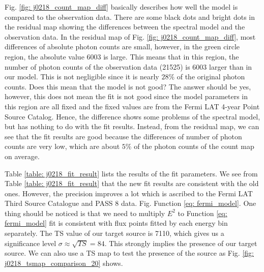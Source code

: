 \documentclass[12pt]{report}
\begin{document}
            Fig. \ref{fig: j0218_count_map_diff} basically describes how well the model is 
            compared to the observation data. There are some black dots and bright dots in 
            the residual map showing the differences between the spectral model and the 
            observation data. In the residual map of Fig. \ref{fig: j0218_count_map_diff}, 
            most differences of absolute photon counts are small, however, in the green 
            circle region, the absolute value 6003 is large. This means that in this region,
            the number of photon counts of the observation data (21525) is 6003 larger than 
            in our model. This is not negligible since it is nearly $28\%$ of the original 
            photon counts. Does this mean that the model is not good? The answer should be 
            yes, however, this does not mean the fit is not good since the model parameters 
            in this region are all fixed and the fixed values are from the Fermi LAT 4-year 
            Point Source Catalog. Hence, the difference shows some problems of the spectral 
            model, but has nothing to do with the fit results. Instead, from the residual map, 
            we can see that the fit results are good because the differences
            of number of photon counts are very low, which are about $5\%$ of the photon 
            counts of the count map on average.

            Table \ref{table: j0218_fit_result} lists the results of the fit parameters. 
            We see from Table \ref{table: j0218_fit_result} that the new fit results are consistent 
            with the old ones. However, the precision improves a lot which is ascribed to the 
            Fermi LAT Third Source Catalogue and PASS 8 data. Fig.
            Function \ref{eq: fermi_model}.
            One thing should be noticed is that we need to multiply $E^2$ to Function \ref{eq: fermi_model} 
            fit is consistent with flux points fitted by each energy bin separately. 
            The TS value of our target source is 7110, which gives us 
            a significance level $\sigma \approx \sqrt{TS} = 84$. This strongly implies the presence of our
            target source. We can also use a TS map to test the presence of the source as Fig.
            \ref{fig: j0218_tsmap_comparison_20} shows. 
            
\end{document}
